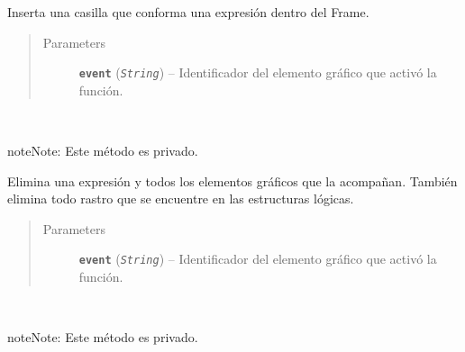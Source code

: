 \documentclass[letterpaper,10pt,english]{sphinxmanual}
\begin{document}
\begin{fulllineitems}
\begin{fulllineitems}
Inserta una casilla que conforma una expresión
dentro del Frame.
\begin{quote}\begin{description}
\item[{Parameters}] \leavevmode
\textbf{\texttt{event}} (\emph{\texttt{String}}) -- Identificador del elemento gráfico que activó la función.

\end{description}\end{quote}

\end{fulllineitems}


\begin{fulllineitems}
\label{View/Additional/MenuInternalOption/InternalOptionTab/ExpressionFrame:View.Additional.MenuInternalOption.InternalOptionTab.ExpressionFrame.ExpressionFrame._ExpressionFrame__delete_single_expression}~
\begin{notice}{note}{Note:}
Este método es privado.
\end{notice}

Elimina una expresión y todos los elementos gráficos que la acompañan.
También elimina todo rastro que se encuentre en las estructuras lógicas.
\begin{quote}\begin{description}
\item[{Parameters}] \leavevmode
\textbf{\texttt{event}} (\emph{\texttt{String}}) -- Identificador del elemento gráfico que activó la función.

\end{description}\end{quote}

\end{fulllineitems}


\begin{fulllineitems}
\label{View/Additional/MenuInternalOption/InternalOptionTab/ExpressionFrame:View.Additional.MenuInternalOption.InternalOptionTab.ExpressionFrame.ExpressionFrame._ExpressionFrame__get_information}~
\begin{notice}{note}{Note:}
Este método es privado.
\end{notice}


\end{fulllineitems}
\end{fulllineitems}
\end{document}
